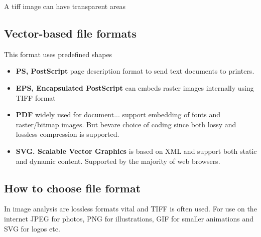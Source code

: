 \begin{wbox}{}
A tiff image can have transparent areas
\end{wbox}


\subsection*{Vector-based file formats}
This format uses predefined shapes

\begin{itemize}
	\item \textbf{PS, PostScript} page description format to send text documents to printers.
	\item \textbf{EPS, Encapsulated PostScript} can embeds raster images internally using TIFF format
	\item \textbf{PDF} widely used for document... support embedding of fonts and raster/bitmap images. But bevare choice of coding since both lossy and lossless compression is supported.
	\item \textbf{SVG. Scalable Vector Graphics} is based on XML and support both static and dynamic content. Supported by the majority of web browsers. 
\end{itemize} 


\subsection*{How to choose file format}
In image analysis are lossless formats vital and TIFF is often used. For use on the internet JPEG for photos, PNG for illustrations, GIF for smaller animations and SVG for logos etc. 











